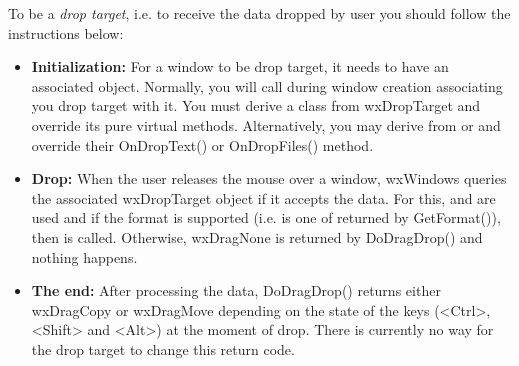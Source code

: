 To be a {\it drop target}, i.e. to receive the data dropped by user you should
follow the instructions below:

\begin{itemize}\itemsep=0pt
\item {\bf Initialization:} For a window to be drop target, it needs to have
an associated  object. Normally, you will
call  during window
creation associating you drop target with it. You must derive a class from
wxDropTarget and override its pure virtual methods. Alternatively, you may
derive from  or
 and override their OnDropText()
or OnDropFiles() method.

\item {\bf Drop:} When the user releases the mouse over a window, wxWindows
queries the associated wxDropTarget object if it accepts the data. For
this,  and  are
used and if the format is
supported (i.e. is one of returned by GetFormat()), 
then  is called. 
Otherwise, wxDragNone is returned by DoDragDrop() and
nothing happens.

\item {\bf The end:} After processing the data, DoDragDrop() returns either
wxDragCopy or wxDragMove depending on the state of the keys (<Ctrl>, <Shift>
and <Alt>) at the moment of drop. There is currently no way for the drop
target to change this return code.
\end{itemize}

